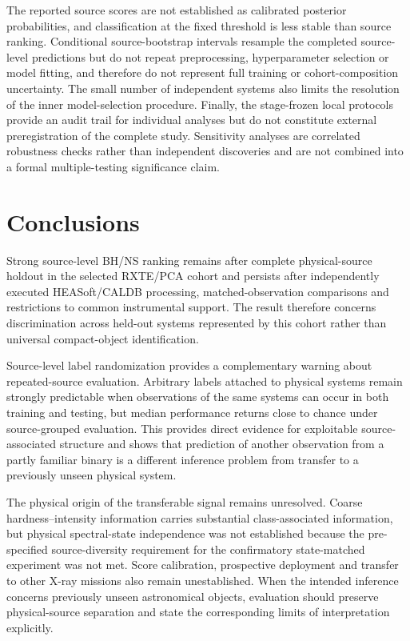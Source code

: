 \documentclass[final,5p,authoryear,nopreprintline]{elsarticle}
\begin{document}
The reported source scores are not established as calibrated posterior probabilities, and classification at the fixed threshold is less stable than source ranking. Conditional source-bootstrap intervals resample the completed source-level predictions but do not repeat preprocessing, hyperparameter selection or model fitting, and therefore do not represent full training or cohort-composition uncertainty. The small number of independent systems also limits the resolution of the inner model-selection procedure. Finally, the stage-frozen local protocols provide an audit trail for individual analyses but do not constitute external preregistration of the complete study. Sensitivity analyses are correlated robustness checks rather than independent discoveries and are not combined into a formal multiple-testing significance claim.

\section{Conclusions}
\label{sec:13}

Strong source-level BH/NS ranking remains after complete physical-source holdout in the selected RXTE/PCA cohort and persists after independently executed HEASoft/CALDB processing, matched-observation comparisons and restrictions to common instrumental support. The result therefore concerns discrimination across held-out systems represented by this cohort rather than universal compact-object identification.

Source-level label randomization provides a complementary warning about repeated-source evaluation. Arbitrary labels attached to physical systems remain strongly predictable when observations of the same systems can occur in both training and testing, but median performance returns close to chance under source-grouped evaluation. This provides direct evidence for exploitable source-associated structure and shows that prediction of another observation from a partly familiar binary is a different inference problem from transfer to a previously unseen physical system.

The physical origin of the transferable signal remains unresolved. Coarse hardness--intensity information carries substantial class-associated information, but physical spectral-state independence was not established because the pre-specified source-diversity requirement for the confirmatory state-matched experiment was not met. Score calibration, prospective deployment and transfer to other X-ray missions also remain unestablished. When the intended inference concerns previously unseen astronomical objects, evaluation should preserve physical-source separation and state the corresponding limits of interpretation explicitly.
\end{document}
